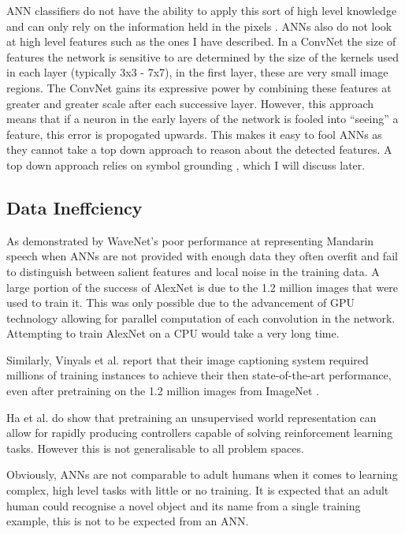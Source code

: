 \ac{ANN} classifiers do not have the ability to apply this sort of high level knowledge and can only rely on the information held in the pixels . \acp{ANN} also do not look at high level features such as the ones I have described. In a \ac{ConvNet} the size of features the network is sensitive to are determined by the size of the kernels used in each layer (typically 3x3 - 7x7), in the first layer, these are very small image regions. The \ac{ConvNet} gains its expressive power by combining these features at greater and greater scale after each successive layer. However, this approach means that if a neuron in the early layers of the network is fooled into ``seeing'' a feature, this error is propogated upwards. This makes it easy to fool \acp{ANN} as they cannot take a top down approach to reason about the detected features. A top down approach relies on symbol grounding \cite{barsalou2008grounded}, which I will discuss later.



\subsection{Data Ineffciency}
As demonstrated by WaveNet's poor performance at representing Mandarin speech \cite{wavenet} when \ac{ANN}s are not provided with enough data they often overfit and fail to distinguish between salient features and local noise in the training data. A large portion of the success of AlexNet \cite{krizhevsky2012imagenet} is due to the 1.2 million images that were used to train it. This was only possible due to the advancement of \ac{GPU} technology allowing for parallel computation of each convolution in the network. Attempting to train AlexNet on a \ac{CPU} would take a very long time.

Similarly, Vinyals et al. \cite{vinyals2015show} report that their image captioning system required millions of training instances to achieve their then state-of-the-art performance, even after pretraining on the 1.2 million images from ImageNet \cite{ImNet}.

Ha et al. \cite{ha2018world, ha2018recurrent} do show that pretraining an unsupervised world representation can allow for rapidly producing controllers capable of solving reinforcement learning tasks. However this is not generalisable to all problem spaces.

Obviously, \ac{ANN}s are not comparable to adult humans when it comes to learning complex, high level tasks with little or no training. It is expected that an adult human could recognise a novel object and its name from a single training example, this is not to be expected from an \ac{ANN}.

